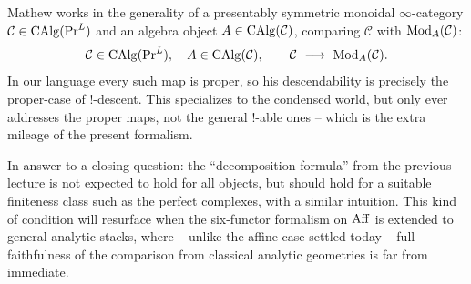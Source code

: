 \begin{remark}
\label{rmk:18:mathew-general}
Mathew works in the generality of a presentably symmetric monoidal
$\infty$-category $\mathcal C\in\operatorname{CAlg}(\mathrm{Pr}^{L})$ and an algebra object
$A\in\operatorname{CAlg}(\mathcal C)$, comparing $\mathcal C$ with $\operatorname{Mod}_A(\mathcal C)$:
\begin{equation*}
\mathcal C\in\operatorname{CAlg}(\mathrm{Pr}^{L}),\quad A\in\operatorname{CAlg}(\mathcal C),\qquad \mathcal C\ \longrightarrow\ \operatorname{Mod}_A(\mathcal C).
\end{equation*}
In our language every such map is proper, so his descendability is precisely the
proper-case of $!$-descent. This specializes to the condensed world, but only ever
addresses the proper maps, not the general $!$-able ones -- which is the extra
mileage of the present formalism.
\end{remark}

\begin{remark}
\label{rmk:18:decomposition}
In answer to a closing question: the ``decomposition formula'' from the previous
lecture is not expected to
hold for all objects, but should hold for a suitable finiteness class such as the
perfect complexes, with a similar intuition. This kind of condition will resurface
when the six-functor formalism on $\operatorname{Aff}$ is extended to general analytic stacks,
where -- unlike the affine case settled today -- full faithfulness of the
comparison from classical analytic geometries is far from immediate.
\end{remark}
